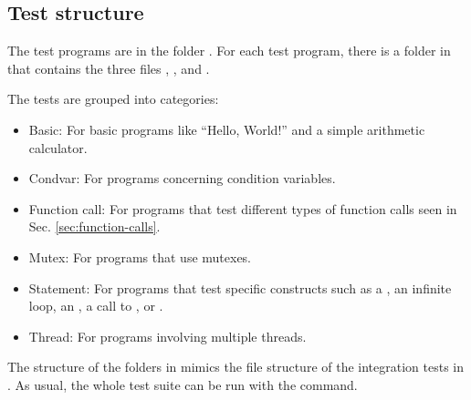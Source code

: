 \subsection{Test structure}

The test programs are in the folder .
For each test program, there is a folder in 
that contains the three files
, , and .

The tests are grouped into categories:

\begin{itemize}
  \item Basic: For basic programs like ``Hello, World!'' and a simple arithmetic calculator.
  \item Condvar: For programs concerning condition variables.
  \item Function call: For programs that test different types
        of function calls seen in Sec. \ref{sec:function-calls}.
  \item Mutex: For programs that use mutexes.
  \item Statement: For programs that test specific constructs such as a ,
        an infinite loop, an , a call to ,
        or .
  \item Thread: For programs involving multiple threads.
\end{itemize}

The structure of the folders in  mimics the file structure
of the integration tests in .
As usual, the whole test suite can be run with the  command.

